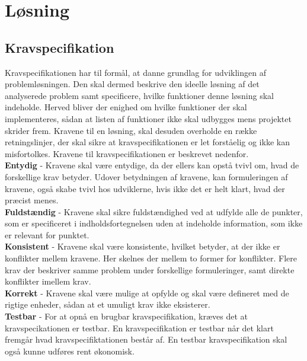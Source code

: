 
\chapter{Løsning}\label{ch:losning}

\section{Kravspecifikation}
Kravspecifikationen har til formål, at danne grundlag for udviklingen af problemløsningen. Den skal dermed beskrive den ideelle løsning af det analyserede problem samt specificere, hvilke funktioner denne løsning skal indeholde. Herved bliver der enighed om hvilke funktioner der skal implementeres, sådan at listen af funktioner ikke skal udbygges mens projektet skrider frem. Kravene til en løsning, skal desuden overholde en række retningslinjer, der skal sikre at kravspecifikationen er let forståelig og ikke kan misfortolkes. Kravene til kravspecifikationen er beskrevet nedenfor.\\ %

 \noindent \textbf{Entydig} - Kravene skal være entydige, da der ellers kan opstå tvivl om, hvad de forskellige krav betyder. Udover betydningen af kravene, kan formuleringen af kravene, også skabe tvivl hos udviklerne, hvis ikke det er helt klart, hvad der præcist menes. \\

\noindent \textbf{Fuldstændig} - Kravene skal sikre fuldstændighed ved at udfylde alle de punkter, som er specificeret i indholdsfortegnelsen uden at indeholde information, som ikke er relevant for punktet.\\

\noindent \textbf{Konsistent} - Kravene skal være konsistente, hvilket betyder, at der ikke er konflikter mellem kravene. Her skelnes der mellem to former for konflikter. Flere krav der beskriver samme problem under forskellige formuleringer, samt direkte konflikter imellem krav.\\

\noindent \textbf{Korrekt} - Kravene skal være mulige at opfylde og skal være defineret med de rigtige enheder, sådan at et umuligt krav ikke eksisterer.\\

\noindent \textbf{Testbar} - For at opnå en brugbar kravspecifikation, kræves det at kravspecikationen er testbar. En kravspecifikation er testbar når det klart fremgår hvad kravspecifiktationen består af. En testbar kravspecifikation skal også kunne udføres rent økonomisk.\\

